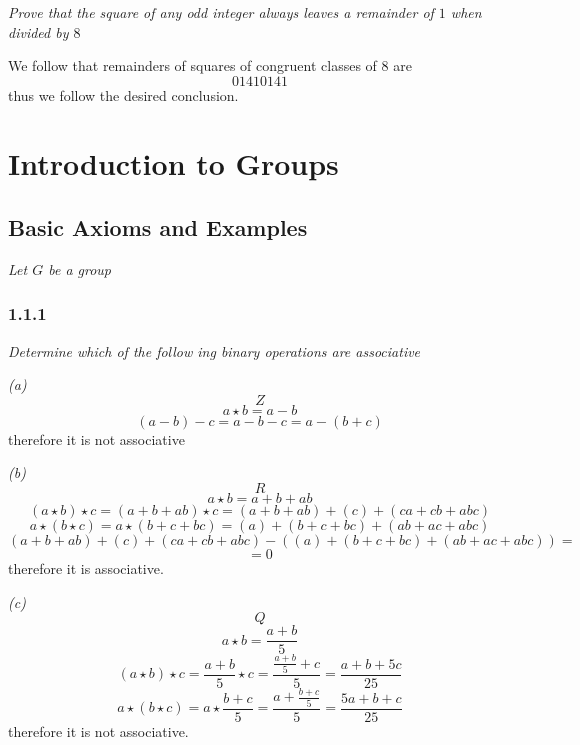 \documentclass[11pt,oneside,titlepage]{book}
\begin{document}
\subsection{}

\textit{Prove that the square of any odd integer always leaves a remainder of $1$ when
  divided by $8$}

We follow that remainders  of squares of congruent classes of $8$ are
$$0 1 4 1 0 1 4 1$$
thus we follow the desired conclusion.




\chapter{Introduction to Groups}

\section{Basic Axioms and Examples}

\textit{Let $G$ be a group}

\subsection*{1.1.1}

\textit{Determine which of the follow ing binary operations are associative}

\textit{(a) }
$$Z$$
$$a \star b = a - b$$
$$(a - b) - c = a - b - c = a - (b + c)$$
therefore it is not associative

\textit{(b) }
$$R$$ 
$$a \star b = a + b + ab$$
$$(a \star b ) \star c = (a + b + ab) \star c = (a + b + ab) + (c) + (ca + cb + abc)$$
$$a \star (b \star c) = a \star (b + c + bc) = (a) + (b + c + bc) + (ab + ac + abc)$$
$$(a + b + ab) + (c) + (ca + cb + abc) - ( (a) + (b + c + bc) + (ab + ac + abc)) = $$
$$ = 0$$
therefore it is associative.

\textit{(c) }
$$Q$$ 
$$a \star b = \frac{a + b}{5}$$
$$(a \star b ) \star c = \frac{a + b}{5} \star c = \frac{\frac{a + b}{5} + c}{5} =
\frac{a + b + 5c}{25}$$
$$a \star (b \star c) = a \star \frac{b + c}{5} = \frac{a + \frac{b + c}{5}}{5} =
\frac{5a + b + c}{25}$$
therefore it is not associative.
\end{document}
